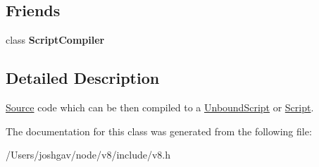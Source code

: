 \subsection*{Friends}
\begin{DoxyCompactItemize}
\item 
class {\bfseries Script\+Compiler}\hypertarget{classv8_1_1_script_compiler_1_1_source_a1cb50af99960b4c11eaee7347e034f51}{}\label{classv8_1_1_script_compiler_1_1_source_a1cb50af99960b4c11eaee7347e034f51}

\end{DoxyCompactItemize}


\subsection{Detailed Description}
\hyperlink{classv8_1_1_script_compiler_1_1_source}{Source} code which can be then compiled to a \hyperlink{classv8_1_1_unbound_script}{Unbound\+Script} or \hyperlink{classv8_1_1_script}{Script}. 

The documentation for this class was generated from the following file\+:\begin{DoxyCompactItemize}
\item 
/\+Users/joshgav/node/v8/include/v8.\+h\end{DoxyCompactItemize}
